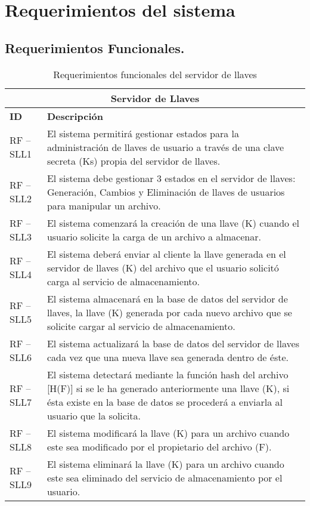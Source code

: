 \chapter{Requerimientos del sistema }

\section{Requerimientos Funcionales. }

\begin{table}[htb]
\centering
\begin{tabular}{| p{2cm} |  p{13.5cm} |}
\hline
\multicolumn{2}{|c|}{\textbf{Servidor de Llaves}} \\ \hline
\textbf{ID} &  \textbf{Descripción} \\
\hline \hline
RF – SLL1 & El sistema permitirá gestionar estados para la administración de llaves de usuario a través de una clave secreta (Ks) propia del servidor de llaves. \\ \hline
RF – SLL2 & El sistema debe gestionar 3 estados en el servidor de llaves: Generación, Cambios y Eliminación de llaves de usuarios para manipular un archivo. \\ \hline
RF – SLL3 & El sistema comenzará la creación de una llave (K) cuando el usuario solicite la carga de un archivo a almacenar. \\ \hline
RF – SLL4 & El sistema deberá enviar al cliente la llave generada en el servidor de llaves (K) del archivo que el usuario solicitó carga al servicio de almacenamiento. \\ \hline
RF – SLL5 & El sistema almacenará en la base de datos del servidor de llaves, la llave (K) generada por cada nuevo archivo que se solicite cargar al servicio de almacenamiento. \\ \hline
RF – SLL6 & El sistema actualizará la base de datos del servidor de llaves cada vez que una nueva llave sea generada dentro de éste. \\ \hline
RF – SLL7 & El sistema detectará mediante la función hash del archivo [H(F)] si se le ha generado anteriormente una llave (K), si ésta existe en la base de datos se procederá a enviarla al usuario que la solicita. \\ \hline
RF – SLL8 & El sistema modificará la llave (K) para un archivo cuando este sea modificado por el propietario del archivo (F). \\ \hline
RF – SLL9 & El sistema eliminará la llave (K) para un archivo cuando este sea eliminado del servicio de almacenamiento por el usuario. \\ \hline
\end{tabular}
\caption{Requerimientos funcionales del servidor de llaves}
\label{Servidor de Llaves }
\end{table}



